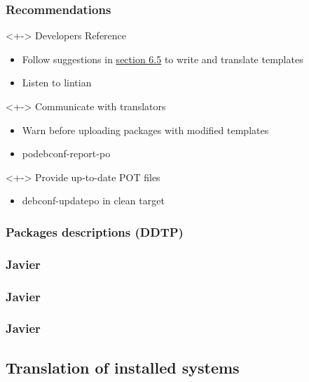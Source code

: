 \documentclass{beamer}
\begin{document}
\begin{frame}
  \frametitle{Recommendations}
	\begin{block}<+->
		{Developers Reference}
		\begin{itemize}
		\item
			Follow suggestions in \href{http://www.debian.org/doc/developers-reference/ch-best-pkging-practices.html\#s-bpp-config-mgmt}{section 6.5} to write and translate templates
		\item
			Listen to lintian
		\end{itemize}
	\end{block}
	\begin{block}<+->
		{Communicate with translators}
		\begin{itemize}
		\item
			Warn before uploading packages with modified templates
		\item
			podebconf-report-po
		\end{itemize}
	\end{block}
	\begin{block}<+->
		{Provide up-to-date POT files}
		\begin{itemize}
		\item
			debconf-updatepo in clean target
		\end{itemize}
	\end{block}
\end{frame}

\subsubsection{Packages descriptions (DDTP)}

\begin{frame}
  \frametitle{Javier}
\end{frame}

\begin{frame}
  \frametitle{Javier}
\end{frame}

\begin{frame}
  \frametitle{Javier}
\end{frame}

\subsection{Translation of installed systems}
\end{document}
